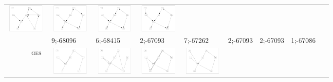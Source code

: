 \begin{table}[!p]
\begin{tabular}{r@{}p{2.0cm}@{}p{2.0cm}@{}p{2.0cm}@{}p{2.0cm}@{}p{2.0cm}@{}p{2.0cm}@{}p{2.0cm}}
\includegraphics[width=20.3mm, height=14.25mm]{fig/26-Feb-2003-16-33-13-dag-asia2000-GS-MSWT-RES} &
\includegraphics[width=20.3mm, height=14.25mm]{fig/26-Feb-2003-16-33-13-dag-asia5000-GS-MSWT-RES} &
\includegraphics[width=20.3mm, height=14.25mm]{fig/26-Feb-2003-16-33-13-dag-asia10000-GS-MSWT-RES} &
\colorbox{Ocase}{\includegraphics[width=20.3mm, height=14.25mm]{fig/26-Feb-2003-16-33-13-dag-asia15000-GS-MSWT-RES}} \\
& 9;-68096 & 6;-68415 & 2;-67093 & 7;-67262 & 2;-67093 & 2;-67093 & \colorbox{Ocase}{1;-67086~~~} \\
\textsc{ges~} &
\includegraphics[width=20.3mm, height=14.25mm]{fig/11-Sep-2003-14-43-10-dag-asia250-GES-RES} &
\includegraphics[width=20.3mm, height=14.25mm]{fig/11-Aug-2003-13-36-32-dag-asia500-GES-RES} &
\includegraphics[width=20.3mm, height=14.25mm]{fig/28-Jul-2003-17-49-38-dag-asia1000-GES-RES} &
\includegraphics[width=20.3mm, height=14.25mm]{fig/28-Jul-2003-17-49-38-dag-asia2000-GES-RES} &

\end{tabular}
\end{table}
